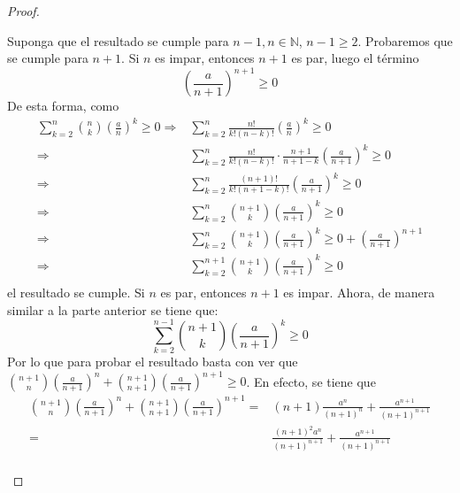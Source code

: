 \documentclass[12pt]{article}
\begin{document}
\begin{enumerate}
\begin{proof}
\begin{itemize}
            Suponga que el resultado se cumple para $n-1, n\in\mathbb{N}$, $n-1\geq2$. Probaremos que se cumple para $n+1$. Si $n$ es impar, entonces $n+1$ es par, luego el término
            \begin{equation*}
                \left(\frac{a}{n+1}\right)^{n+1}\geq0
            \end{equation*}
            De esta forma, como
            \begin{equation*}
                \begin{split}
                    \sum_{k=2}^{n}{n \choose k}\left(\frac{a}{n}\right)^k\geq0\Rightarrow&\sum_{k=2}^{n}\frac{n!}{k!(n-k)!}\left(\frac{a}{n}\right)^k\geq0\\
                    \Rightarrow&\sum_{k=2}^{n}\frac{n!}{k!(n-k)!}\cdot\frac{n+1}{n+1-k}\left(\frac{a}{n+1}\right)^k\geq0\\
                    \Rightarrow&\sum_{k=2}^{n}\frac{(n+1)!}{k!(n+1-k)!}\left(\frac{a}{n+1}\right)^k\geq0\\
                    \Rightarrow&\sum_{k=2}^{n}{n+1 \choose k}\left(\frac{a}{n+1}\right)^k\geq0\\
                    \Rightarrow&\sum_{k=2}^{n}{n+1 \choose k}\left(\frac{a}{n+1}\right)^k\geq0+\left(\frac{a}{n+1}\right)^{n+1}\\
                    \Rightarrow&\sum_{k=2}^{n+1}{n+1 \choose k}\left(\frac{a}{n+1}\right)^k\geq0\\
                \end{split}
            \end{equation*}
            el resultado se cumple. Si $n$ es par, entonces $n+1$ es impar. Ahora, de manera similar a la parte anterior se tiene que:
            \begin{equation*}
                \sum_{k=2}^{n-1}{n+1 \choose k}\left(\frac{a}{n+1}\right)^k\geq0
            \end{equation*}
            Por lo que para probar el resultado basta con ver que ${n+1 \choose n}\left(\frac{a}{n+1}\right)^n+{n+1 \choose n+1}\left(\frac{a}{n+1}\right)^{n+1}\geq0$. En efecto, se tiene que
            \begin{equation*}
                \begin{split}
                    {n+1 \choose n}\left(\frac{a}{n+1}\right)^n+{n+1 \choose n+1}\left(\frac{a}{n+1}\right)^{n+1}=&(n+1)\frac{a^n}{(n+1)^n}+\frac{a^{n+1}}{(n+1)^{n+1}}\\
                    =&\frac{(n+1)^2a^n}{(n+1)^{n+1}}+\frac{a^{n+1}}{(n+1)^{n+1}}\\

\end{split}
\end{equation*}
\end{itemize}
\end{proof}
\end{enumerate}
\end{document}
